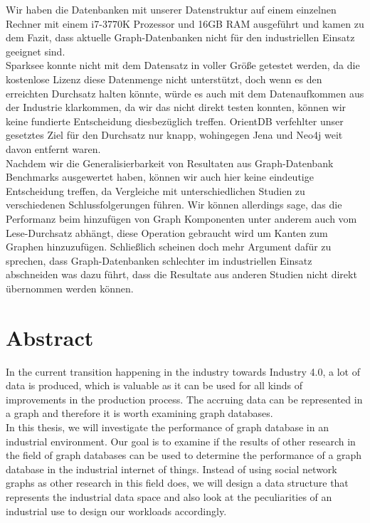 Wir haben die Datenbanken mit unserer Datenstruktur auf einem einzelnen Rechner mit einem i7-3770K Prozessor und 16GB RAM ausgeführt und kamen zu dem Fazit,
dass aktuelle Graph-Datenbanken nicht für den industriellen Einsatz geeignet sind.\\
Sparksee konnte nicht mit dem Datensatz in voller Größe getestet werden,
da die kostenlose Lizenz diese Datenmenge nicht unterstützt,
doch wenn es den erreichten Durchsatz halten könnte,
würde es auch mit dem Datenaufkommen aus der Industrie klarkommen,
da wir das nicht direkt testen konnten,
können wir keine fundierte Entscheidung diesbezüglich treffen.
OrientDB verfehlter unser gesetztes Ziel für den Durchsatz nur knapp,
wohingegen Jena und Neo4j weit davon entfernt waren.\\
Nachdem wir die Generalisierbarkeit von Resultaten aus Graph-Datenbank Benchmarks ausgewertet haben,
können wir auch hier keine eindeutige Entscheidung treffen,
da Vergleiche mit unterschiedlichen Studien zu verschiedenen Schlussfolgerungen führen.
Wir können allerdings sage,
das die Performanz beim hinzufügen von Graph Komponenten unter anderem auch vom Lese-Durchsatz abhängt,
diese Operation gebraucht wird um Kanten zum Graphen hinzuzufügen.
Schließlich scheinen doch mehr Argument dafür zu sprechen,
dass Graph-Datenbanken schlechter im industriellen Einsatz abschneiden was dazu führt,
dass die Resultate aus anderen Studien nicht direkt übernommen werden können.

\cleardoublepage

\chapter*{Abstract}

In the current transition happening in the industry towards Industry 4.0,
a lot of data is produced,
which is valuable as it can be used for all kinds of improvements in the production process.
The accruing data can be represented in a graph and therefore it is worth examining graph databases.\\
In this thesis,
we will investigate the performance of graph database in an industrial environment.
Our goal is to examine if the results of other research in the field of graph databases can be used to determine the performance of a graph database in the industrial internet of things.
Instead of using social network graphs as other research in this field does,
we will design a data structure that represents the industrial data space and also look at the peculiarities of an industrial use to design our workloads accordingly.

